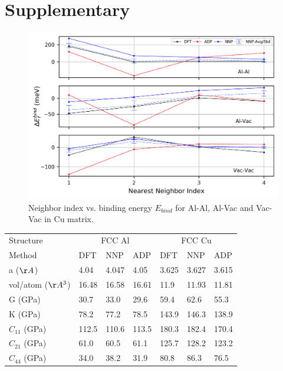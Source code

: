 \documentclass{article}
\begin{document}
\newpage
  

\newpage
\appendix
\section{Supplementary}
\begin{figure}[H]%
\centering%
\includegraphics[width=1\textwidth,center]{./figures/solsol_in_cu.png}%
\caption{Neighbor index vs. binding energy $E_{bind}$ for Al-Al, Al-Vac and Vac-Vac in Cu matrix.}%
\label{fig:solsol_in_cu}
\end{figure}



\begin{tabular}{l|lll|lll}%
\hline%
Structure&\multicolumn{3}{c}{FCC Al}&\multicolumn{3}{c}{FCC Cu}\\%
Method&DFT&NNP&ADP&DFT&NNP&ADP\\%
\hline%
a ($\AA$)&4.04&4.047&4.05&3.625&3.627&3.615\\%
vol/atom ($\AA^3$)&16.48&16.58&16.61&11.9&11.93&11.81\\%
G (GPa)&30.7&33.0&29.6&59.4&62.6&55.3\\%
K (GPa)&78.2&77.2&78.5&143.9&146.3&138.9\\%
$C_{11}$ (GPa)&112.5&110.6&113.5&180.3&182.4&170.4\\%
$C_{21}$ (GPa)&61.0&60.5&61.1&125.7&128.2&123.2\\%
$C_{44}$ (GPa)&34.0&38.2&31.9&80.8&86.3&76.5\\%
\hline%
\end{tabular}%
\newline%
\newline%
\newline%
\newline%
\end{document}
